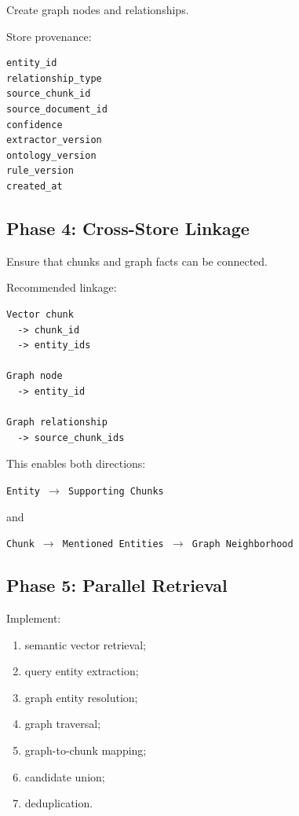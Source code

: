 \documentclass[11pt,a4paper]{article}
\begin{document}
Create graph nodes and relationships.

Store provenance:

\begin{lstlisting}
entity_id
relationship_type
source_chunk_id
source_document_id
confidence
extractor_version
ontology_version
rule_version
created_at
\end{lstlisting}

\subsection{Phase 4: Cross-Store Linkage}

Ensure that chunks and graph facts can be connected.

Recommended linkage:

\begin{lstlisting}
Vector chunk
  -> chunk_id
  -> entity_ids

Graph node
  -> entity_id

Graph relationship
  -> source_chunk_ids
\end{lstlisting}

This enables both directions:

\begin{center}
\texttt{Entity $\rightarrow$ Supporting Chunks}
\end{center}

and

\begin{center}
\texttt{Chunk $\rightarrow$ Mentioned Entities $\rightarrow$ Graph Neighborhood}
\end{center}

\subsection{Phase 5: Parallel Retrieval}

Implement:

\begin{enumerate}
\item semantic vector retrieval;
\item query entity extraction;
\item graph entity resolution;
\item graph traversal;
\item graph-to-chunk mapping;
\item candidate union;
\item deduplication.
\end{enumerate}
\end{document}
